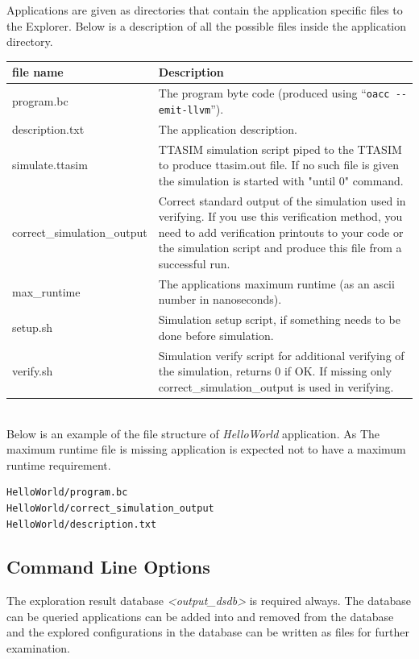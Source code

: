\documentclass[a4paper,twoside]{tceusermanual}
\begin{document}
Applications are given as directories that contain the application specific
files to the Explorer. Below is a description of all the possible files inside
the application directory.

\begin{tabular}{p{}p{}}
\textbf{file name} &\textbf{Description} \\
\hline
program.bc & The program byte code (produced using ``\verb|oacc --emit-llvm|'').\\
description.txt & The application description.\\
simulate.ttasim & TTASIM simulation script piped to the TTASIM to produce
ttasim.out file. If no such file is given the simulation is started with
"until 0" command.\\
correct\_simulation\_output & Correct standard output of the simulation used in
verifying. If you use this verification method, you need to add verification 
printouts to your code or the simulation script and produce this file from a
successful run.\\
max\_runtime & The applications maximum runtime (as an ascii number in nanoseconds).\\
setup.sh & Simulation setup script, if something needs to be done before
simulation.\\
verify.sh & Simulation verify script for additional verifying of the
simulation, returns 0 if OK. If missing only correct\_simulation\_output is used
in verifying.\\
\end{tabular}\\

Below is an example of the file structure of \emph{HelloWorld} application.
As The maximum runtime file is missing application is expected not to have a
maximum runtime requirement.
\begin{verbatim}
HelloWorld/program.bc
HelloWorld/correct_simulation_output
HelloWorld/description.txt
\end{verbatim}

\subsection{Command Line Options}

The exploration result database \emph{<output\_dsdb>} is required always. The
database can be queried applications can be added into and removed from the 
database and the explored configurations in the database can be written as
files for further examination.
\end{document}
